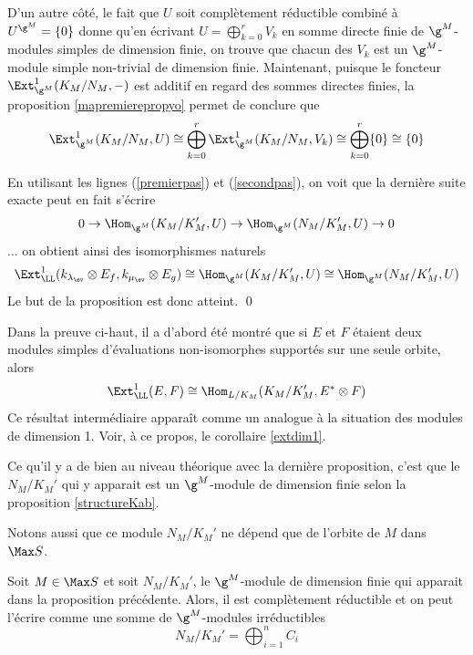 \begin{Prop}
\begin{pre}
D'un autre côté, le fait que $U$ soit complètement réductible combiné à $U^{\g^M} = \{0\}$ donne qu'en écrivant $U = \bigoplus_{k=0}^r V_k$ en somme directe finie de $\g^M$-modules simples de dimension finie, on trouve que chacun des $V_k$ est un $\g^M$-module simple non-trivial de dimension finie. Maintenant, puisque le foncteur $\Ext_{\g^M}^1(K_M/N_M,-)$ est additif en regard des sommes directes finies, la proposition \ref{mapremierepropyo} permet de conclure que
\begin{equation} \label{secondpas}
\Ext_{\g^M}^1(K_M/N_M,U) \cong \bigoplus_{k=0}^r \Ext_{\g^M}^1(K_M/N_M,V_k) \cong  \bigoplus_{k=0}^r \{0\} \cong \{0\}
\end{equation}

En utilisant les lignes (\ref{premierpas}) et (\ref{secondpas}), on voit que la dernière suite exacte peut en fait s'écrire
$$ 0 \rightarrow \Hom_{\g^M}(K_M/K_M',U) \rightarrow \Hom_{\g^M}(N_M/K_M',U) \rightarrow 0 $$
... on obtient ainsi des isomorphismes naturels
$$ \Ext_\LL^1(k_{\lambda_{\ev}} \otimes E_f,k_{\mu_{\ev}} \otimes E_g) \cong \Hom_{\g^M}(K_M/K_M',U) \cong \Hom_{\g^M}(N_M/K_M',U) $$
Le but de la proposition est donc atteint. \qed
\end{pre}
\end{Prop}

\begin{Rem} Dans la preuve ci-haut, il a d'abord été montré que si $E$ et $F$ étaient deux modules simples d'évaluations non-isomorphes supportés sur une seule orbite, alors 
$$ \Ext_\LL^1(E,F) \cong \Hom_{L/K_M}(K_M/K_M',E^* \otimes F) $$
Ce résultat intermédiaire apparaît comme un analogue à la situation des modules de \linebreak dimension 1. Voir, à ce propos, le corollaire \ref{extdim1}.  
\end{Rem}


\begin{Rem} Ce qu'il y a de bien au niveau théorique avec la dernière proposition, c'est que le $N_M/K_M'$ qui y apparait est un $\g^M$-module de dimension finie selon la proposition \ref{structureKab}. 

Notons aussi que ce module $N_M/K_M'$ ne dépend que de l'orbite de $M$ dans $\Max S$.
\end{Rem}

Soit $M \in \Max S$ et soit $N_M/K_M'$, le $\g^M$-module de dimension finie qui apparait dans la proposition précédente. Alors, il est complètement réductible et on peut l'écrire comme une somme de $\g^M$-modules irréductibles
\begin{equation} \label{constituantsnsurkprime}
N_M/K_M' = \bigoplus_{i=1}^n C_i
\end{equation}

